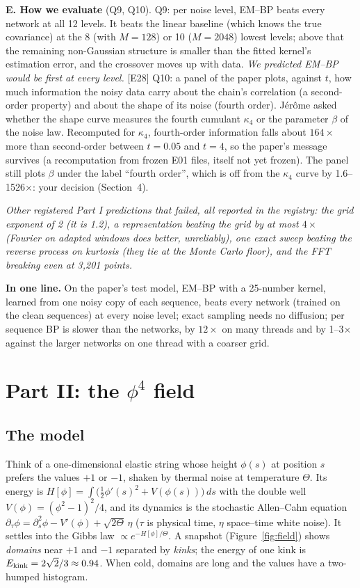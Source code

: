 \documentclass[11pt,a4paper]{article}
\newcommand{\key}[1]{\par\smallskip\noindent\colorbox{soft}{\parbox{\dimexpr\linewidth-2\fboxsep}{\small\textbf{In one line.} #1}}\par\smallskip}
\newcommand{\src}[1]{{\footnotesize\color{gray}[#1]}}
\newcommand{\fals}[1]{{\small\itshape #1}}
\begin{document}
\textbf{E. How we evaluate} (Q9, Q10). Q9: per noise level, EM--BP beats every network at all 12 levels. It beats the linear
baseline (which knows the true covariance) at the 8 (with $M=128$) or 10 ($M=2048$) lowest levels; above that the remaining
non-Gaussian structure is smaller than the fitted kernel's estimation error, and the crossover moves up with data. \fals{We
predicted EM--BP would be first at every level.} \src{E28}
Q10: a panel of the paper plots, against $t$, how much information the noisy data carry about the chain's correlation (a
second-order property) and about the shape of its noise (fourth order). Jérôme asked whether the shape curve measures the fourth
cumulant $\kappa_4$ or the parameter $\beta$ of the noise law. Recomputed for $\kappa_4$, fourth-order information falls about $164\times$
more than second-order between $t=0.05$ and $t=4$, so the paper's message survives (a recomputation from frozen E01 files, itself not
yet frozen). The panel still plots $\beta$ under the label ``fourth order'', which is off from the $\kappa_4$ curve by
1.6--1526$\times$: your decision (Section~4).

\fals{Other registered Part I predictions that failed, all reported in the registry: the grid exponent of 2 (it is 1.2), a
representation beating the grid by at most $4\times$ (Fourier on adapted windows does better, unreliably), one exact sweep beating
the reverse process on kurtosis (they tie at the Monte Carlo floor), and the FFT breaking even at 3,201 points.}

\key{On the paper's test model, EM--BP with a 25-number kernel, learned from one noisy copy of each sequence, beats every network
(trained on the clean sequences) at every noise level; exact sampling needs no diffusion; per sequence BP is slower than the
networks, by $12\times$ on many threads and by 1--3$\times$ against the larger networks on one thread with a coarser grid.}

\section{Part II: the $\phi^4$ field}

\subsection{The model}

Think of a one-dimensional elastic string whose height $\phi(s)$ at position $s$ prefers the values $+1$ or $-1$, shaken by thermal
noise at temperature $\Theta$. Its energy is $H[\phi]=\int\big(\tfrac12\phi'(s)^2+V(\phi(s))\big)\,ds$ with the double well
$V(\phi)=(\phi^2-1)^2/4$, and its dynamics is the stochastic Allen--Cahn equation
$\partial_\tau\phi=\partial_s^2\phi-V'(\phi)+\sqrt{2\Theta}\,\eta$ ($\tau$ is physical time, $\eta$ space--time white noise). It settles into the Gibbs
law $\propto e^{-H[\phi]/\Theta}$. A snapshot (Figure~\ref{fig:field}) shows \emph{domains} near $+1$ and $-1$ separated by
\emph{kinks}; the energy of one kink is $E_{\rm kink}=2\sqrt2/3\approx0.94$. When cold, domains are long and the values have a
two-humped histogram.
\end{document}

